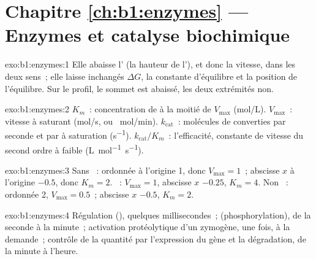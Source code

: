 \section*{Chapitre \ref{ch:b1:enzymes} --- Enzymes et catalyse biochimique}

\begin{solution}{exo:b1:enzymes:1}
Elle abaisse l' (la hauteur de l'), et donc la vitesse, dans les deux sens~; elle laisse
inchangés $\Delta G$, la constante d'équilibre et la position de
l'équilibre. Sur le profil, le sommet est abaissé, les deux extrémités
non.
\end{solution}

\begin{solution}{exo:b1:enzymes:2}
$K_m$~: concentration de  à la moitié de $V_{\max}$
(\unit{mol/L}). $V_{\max}$~: vitesse à  saturant (\unit{mol/s},
ou \unit{\micro
mol/min}). $k_{\text{cat}}$~: molécules de  converties par
seconde et par  à saturation (\unit{s^{-1}}).
$k_{\text{cat}}/K_m$~: l'efficacité, constante de vitesse du second
ordre à faible  (\unit{L.mol^{-1}.s^{-1}}).
\end{solution}

\begin{solution}{exo:b1:enzymes:3}
Sans ~: ordonnée à l'origine 1, donc $V_{\max} = 1$~;
abscisse $x$ à l'origine $-0.5$, donc $K_m = 2$. ~:
$V_{\max} = 1$, abscisse $x$ $-0.25$, $K_m = 4$. Non ~:
ordonnée 2, $V_{\max} = 0.5$~; abscisse $x$ $-0.5$, $K_m = 2$.
\end{solution}

\begin{solution}{exo:b1:enzymes:4}
Régulation  (), quelques millisecondes~;
 (phosphorylation), de la seconde à la minute~;
activation protéolytique d'un zymogène, une fois, à la demande~;
contrôle de la quantité par l'expression du gène et la dégradation, de
la minute à l'heure.
\end{solution}

